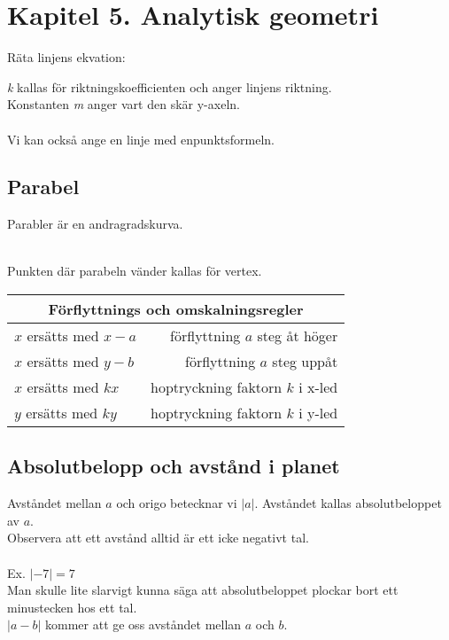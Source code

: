 \documentclass[11pt]{article}
\begin{document}
\section{Kapitel 5. Analytisk geometri}
Räta linjens ekvation: 
\begin{center}
\end{center}
\emph{k} kallas för riktningskoefficienten och anger linjens riktning. \\
Konstanten \emph{m} anger vart den skär y-axeln.  \\ \\
Vi kan också ange en linje med enpunktsformeln. 
\begin{center}
\end{center}

\subsection{Parabel}
Parabler är en andragradskurva. 
\begin{figure}[h]
  \begin{center}
  \end{center}
  \label{bild3}
\end{figure} \\
Punkten där parabeln vänder kallas för vertex. 
\begin{center}
\begin{tabular}{l|r}
 \hline
  \multicolumn{2}{c}{Förflyttnings och omskalningsregler} \\
  \hline
  $x$ ersätts med $x-a$		&	förflyttning $a$ steg åt höger \\
  $x$ ersätts med $y-b$		&	förflyttning $a$ steg uppåt \\
  $x$ ersätts med $kx$		&	hoptryckning faktorn $k$ i x-led \\
  $y$ ersätts med $ky$		&	hoptryckning faktorn $k$ i y-led \\
  \end{tabular}
\end{center}
\subsection{Absolutbelopp och avstånd i planet}
Avståndet mellan $a$ och origo betecknar vi $|a|$. Avståndet kallas absolutbeloppet av $a$. \\
Observera att ett avstånd alltid är ett icke negativt tal. \\ \\
Ex. $|-7| = 7$ \\
Man skulle lite slarvigt kunna säga att absolutbeloppet plockar bort ett minustecken hos ett tal. \\
$|a-b|$ kommer att ge oss avståndet mellan $a$ och $b$.
\end{document}
